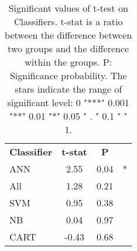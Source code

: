 

\begin{table}[htbp]
\begin{center}
\begin{tabular}{|l|c|c|c}
\cline{1-3}
\textbf{Classifier} & \textbf{t-stat} & \textbf{P}\\
\cline{1-3}
          ANN &   2.55 &   0.04  &  * \\
          All &   1.28 &   0.21 &    \\
          SVM &   0.95 &   0.38 &   \\
          NB &   0.04 &   0.97 &     \\
          CART &   -0.43 &  0.68 &   \\
\cline{1-3}
\end{tabular}
\caption[]
{\small
  Significant values of t-test on Classifiers.  t-stat is a ratio between the difference between two groups and the difference within the groups. P: Significance probability. The stars indicate the range of significant level: 0 "***" 0.001 "**" 0.01 "*" 0.05 " . " 0.1 " " 1.
}
\label{table:ttest_result}
\end{center}
\end{table}


%

